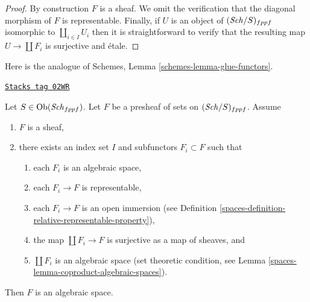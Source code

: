 \begin{proof}
By construction $F$ is a sheaf. We omit the verification that the
diagonal morphism of $F$ is representable. Finally, if $U$ is an
object of $(\mathit{Sch}/S)_{fppf}$ isomorphic to $\coprod_{i \in I} U_i$
then it is straightforward to verify that the resulting map
$U \to \coprod F_i$ is surjective and \'etale.
\end{proof}

Here is the analogue of Schemes, Lemma \ref{schemes-lemma-glue-functors}.

\begin{lemma}
\label{spaces-lemma-glueing-algebraic-spaces}
\href{https://stacks.math.columbia.edu/tag/02WR}{\texttt{Stacks tag 02WR}}

Let $S \in \operatorname{Ob}(\mathit{Sch}_{fppf})$.
Let $F$ be a presheaf of sets on $(\mathit{Sch}/S)_{fppf}$.
Assume
\begin{enumerate}
\item $F$ is a sheaf,
\item there exists an index set $I$
and subfunctors $F_i \subset F$ such that
\begin{enumerate}
\item each $F_i$ is an algebraic space,
\item each $F_i \to F$ is representable,
\item each $F_i \to F$ is an open immersion (see
Definition \ref{spaces-definition-relative-representable-property}),
\item the map $\coprod F_i \to F$ is surjective as a map of sheaves, and
\item $\coprod F_i$ is an algebraic space (set theoretic condition, see
Lemma \ref{spaces-lemma-coproduct-algebraic-spaces}).
\end{enumerate}
\end{enumerate}
Then $F$ is an algebraic space.
\end{lemma}

